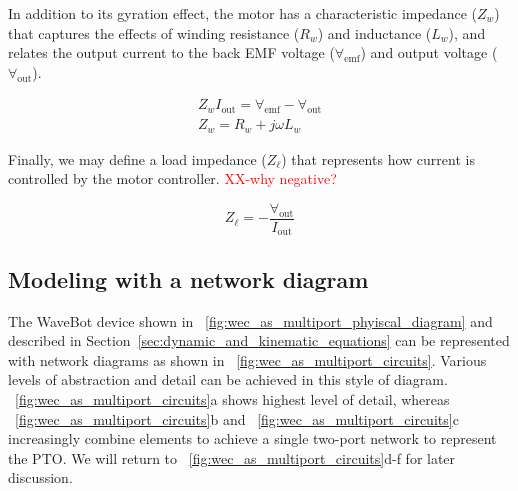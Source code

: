 \documentclass[lettersize,journal]{IEEEtran}
\newcommand{\rc}[1]{\textcolor{red}{#1}}
\begin{document}
\noindent{}In addition to its gyration effect, the motor has a characteristic impedance ($Z_w$) that captures the effects of winding resistance ($R_w$) and inductance ($L_w$), and relates the output current to the back EMF voltage ($\forall_{\textrm{emf}}$) and output voltage ($\forall_{\textrm{out}}$).

\begin{subequations}
        \begin{gather}
                Z_w I_{\textrm{out}} = \forall_{\textrm{emf}} - \forall_{\textrm{out}} \\
                Z_w = R_w + j \omega L_w \label{eq:winding_impedance}
        \end{gather}
\end{subequations}

Finally, we may define a load impedance ($Z_\ell$) that represents how current is controlled by the motor controller.
\rc{XX-why negative?}


\begin{equation}
        Z_\ell = -\frac{\forall_{\textrm{out}}}{I_{\textrm{out}}}
        \label{eq:load_impedance}
\end{equation}

\subsection{Modeling with a network diagram}\label{sec:modeling_with_a_network_diagram}

The WaveBot device shown in \figurename~\ref{fig:wec_as_multiport_phyiscal_diagram} and described in Section~\ref{sec:dynamic_and_kinematic_equations} can be represented with network diagrams as shown in \figurename~\ref{fig:wec_as_multiport_circuits}.
Various levels of abstraction and detail can be achieved in this style of diagram.
\figurename~\ref{fig:wec_as_multiport_circuits}a shows highest level of detail, whereas \figurename~\ref{fig:wec_as_multiport_circuits}b and \figurename~\ref{fig:wec_as_multiport_circuits}c increasingly combine elements to achieve a single two-port network to represent the PTO.
We will return to \figurename~\ref{fig:wec_as_multiport_circuits}d-f for later discussion.
\end{document}
